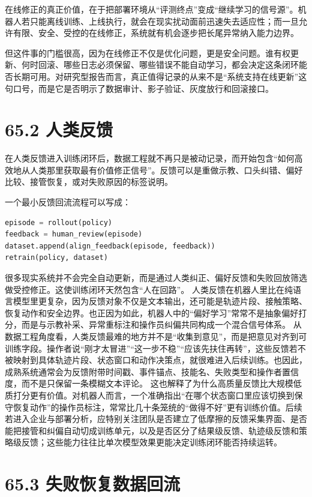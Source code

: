 在线修正的真正价值，在于把部署环境从“评测终点”变成“继续学习的信号源”。机器人若只能离线训练、上线执行，就会在现实扰动面前迅速失去适应性；而一旦允许有限、安全、受控的在线修正，系统就有机会逐步把长尾异常纳入能力边界。

但这件事的门槛很高，因为在线修正不仅是优化问题，更是安全问题。谁有权更新、何时回滚、哪些日志必须保留、哪些错误不能自动学习，都会决定这条闭环能否长期可用。对研究型报告而言，真正值得记录的从来不是“系统支持在线更新”这句口号，而是它是否明示了数据审计、影子验证、灰度放行和回滚接口。

\section*{65.2 人类反馈}


在人类反馈进入训练闭环后，数据工程就不再只是被动记录，而开始包含“如何高效地从人类那里获取最有价值修正信号”。反馈可以是重做示教、口头纠错、偏好比较、接管恢复，或对失败原因的标签说明。

一个最小反馈回流流程可以写成：

\begin{lstlisting}[language=python]
episode = rollout(policy)
feedback = human_review(episode)
dataset.append(align_feedback(episode, feedback))
retrain(policy, dataset)
\end{lstlisting}

很多现实系统并不会完全自动更新，而是通过人类纠正、偏好反馈和失败回放筛选做受控修正。这使训练闭环天然包含“人在回路”。 人类反馈在机器人里比在纯语言模型里更复杂，因为反馈对象不仅是文本输出，还可能是轨迹片段、接触策略、恢复动作和安全边界。也正因为如此，机器人中的“偏好学习”常常不是抽象偏好打分，而是与示教补采、异常重标注和操作员纠偏共同构成一个混合信号体系。 从数据工程角度看，人类反馈最难的地方并不是“收集到意见”，而是把意见对齐到可训练字段。操作者说“刚才太冒进”“这一步不稳”“应该先扶住再转”，这些反馈若不被映射到具体轨迹片段、状态窗口和动作决策点，就很难进入后续训练。也因此，成熟系统通常会为反馈附带时间戳、事件锚点、技能名、失败类型和操作者置信度，而不是只保留一条模糊文本评论。 这也解释了为什么高质量反馈比大规模低质打分更有价值。对机器人而言，一个准确指出“在哪个状态窗口里应该切换到保守恢复动作”的操作员标注，常常比几十条笼统的“做得不好”更有训练价值。后续若进入企业与部署分析，应特别关注团队是否建立了低摩擦的反馈采集界面、是否能把接管和纠偏自动切成训练单元，以及是否区分了结果级反馈、轨迹级反馈和策略级反馈；这些能力往往比单次模型效果更能决定训练闭环能否持续运转。

\section*{65.3 失败恢复数据回流}


